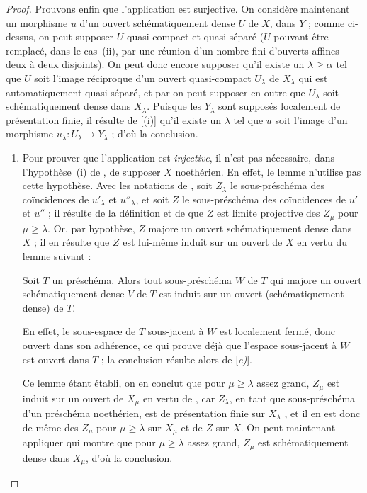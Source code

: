 \begin{proof}
Prouvons enfin que l'application  est surjective.
On considère maintenant un morphisme $u$ d'un ouvert schématiquement dense $U$ de $X$, dans $Y$ ; comme ci-dessus, on peut supposer $U$ quasi-compact et quasi-séparé ($U$ pouvant être remplacé, dans le cas~(ii), par une réunion d'un nombre fini d'ouverts affines deux à deux disjoints).
On peut donc encore supposer qu'il existe un $\lambda\geq\alpha$ tel que $U$ soit l'image réciproque d'un ouvert quasi-compact $U_\lambda$ de $X_\lambda$  qui est automatiquement quasi-séparé, et par  on peut supposer en outre que $U_\lambda$ soit schématiquement dense dans $X_\lambda$.
Puisque les $Y_\lambda$ sont supposés localement de présentation finie, il résulte de [(i)] qu'il existe un $\lambda$ tel que $u$ soit l'image d'un morphisme $u_\lambda:U_\lambda\to Y_\lambda$ ; d'où la conclusion.

\begin{remarks}[20.3.8.7]
\label{IV.20.3.8.7}
\begin{enumerate}[label=(\roman*)]
  \item Pour prouver que l'application  est \emph{injective}, il n'est pas nécessaire, dans l'hypothèse~(i) de , de supposer $X$ noethérien.
  En effet, le lemme  n'utilise pas cette hypothèse.
  Avec les notations de , soit $Z_\lambda$ le sous-préschéma des coïncidences de $u'_\lambda$ et $u''_\lambda$, et soit $Z$ le sous-préschéma des coïncidences de $u'$ et $u''$ ; il résulte de la définition  et de  que $Z$ est limite projective des $Z_\mu$ pour $\mu\geq\lambda$.
  Or, par hypothèse, $Z$ majore un ouvert schématiquement dense dans $X$ ; il en résulte que $Z$ est lui-même induit sur un ouvert de $X$ en vertu du lemme suivant :

\begin{lemma}[20.3.8.8]
\label{IV.20.3.8.8}
Soit $T$ un préschéma.
Alors tout sous-préschéma $W$ de $T$ qui majore un ouvert schématiquement dense $V$ de $T$ est induit sur un ouvert (schématiquement dense) de $T$.
\end{lemma}

  En effet, le sous-espace de $T$ sous-jacent à $W$ est localement fermé, donc ouvert
  dans son adhérence, ce qui prouve déjà que l'espace sous-jacent à $W$ est ouvert dans $T$ ; la conclusion résulte alors de [\emph{c)}].

  Ce lemme étant établi, on en conclut que pour $\mu\geq\lambda$ assez grand, $Z_\mu$ est induit sur un ouvert de $X_\mu$ en vertu de , car $Z_\lambda$, en tant que sous-préschéma d'un préschéma noethérien, est de présentation finie sur $X_\lambda$ , et il en est donc de même des $Z_\mu$ pour $\mu\geq\lambda$ sur $X_\mu$ et de $Z$ sur $X$.
  On peut maintenant appliquer  qui montre que pour $\mu\geq\lambda$ assez grand, $Z_\mu$ est schématiquement dense dans $X_\mu$, d'où la conclusion.


\end{enumerate}
\end{remarks}
\end{proof}
